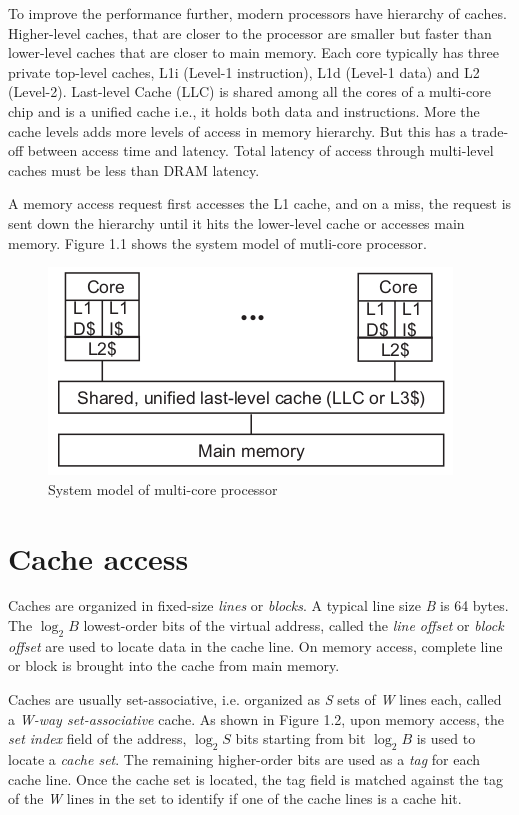 \documentclass[a4paper,12pt, final]{report}
\begin{document}
To improve the performance further, modern processors have hierarchy of caches. Higher-level caches, that are closer to the processor are smaller but faster than lower-level caches that are closer to main memory. Each core typically has three private top-level caches, L1i (Level-1 instruction), L1d (Level-1 data) and L2 (Level-2). Last-level Cache (LLC) is shared among all the cores of a multi-core chip and is a unified cache i.e., it holds both data and instructions. More the cache levels adds more levels of access in memory hierarchy. But this has a trade-off between access time and latency. Total latency of access through multi-level caches must be less than DRAM latency.

A memory access request first accesses the L1 cache, and on a miss, the request is sent down the hierarchy until it hits the lower-level cache or accesses main memory. Figure 1.1 shows the system model of mutli-core processor.

\begin{figure}[h]
    \centering
    \includegraphics[scale=0.7]{images/multi_core_system_model.png}
    \caption{System model of multi-core processor \cite{prime_probe_llc}}
\end{figure}

\section{Cache access}
Caches are organized in fixed-size \textit{lines} or \textit{blocks}. A typical line size \textit{B} is 64 bytes. The $\log_{2}B$ lowest-order bits of the virtual address, called the \textit{line offset} or \textit{block offset} are used to locate data in the cache line. On memory access, complete line or block is brought into the cache from main memory.

Caches are usually set-associative, i.e. organized as \textit{S} sets of \textit{W} lines each, called a \textit{W-way set-associative} cache. As shown in Figure 1.2, upon memory access, the \textit{set index} field of the address, $\log_{2}S$ bits starting from bit $\log_{2}B$ is used to locate a \textit{cache set}. The remaining higher-order bits are used as a \textit{tag} for each cache line. Once the cache set is located, the tag field is matched against the tag of the \textit{W} lines in the set to identify if one of the cache lines is a cache hit.
\end{document}
